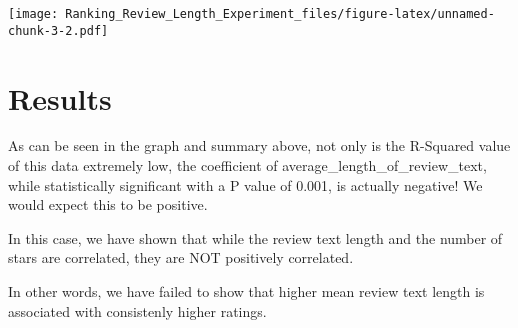 \documentclass[
]{article}
\begin{document}
\texttt{[image: Ranking\_Review\_Length\_Experiment\_files/figure-latex/unnamed-chunk-3-2.pdf]}

\hypertarget{results}{%
\section{Results}\label{results}}

As can be seen in the graph and summary above, not only is the R-Squared
value of this data extremely low, the coefficient of
average\_length\_of\_review\_text, while statistically significant with
a P value of 0.001, is actually negative! We would expect this to be
positive.

In this case, we have shown that while the review text length and the
number of stars are correlated, they are NOT positively correlated.

In other words, we have failed to show that higher mean review text
length is associated with consistenly higher ratings.
\end{document}

